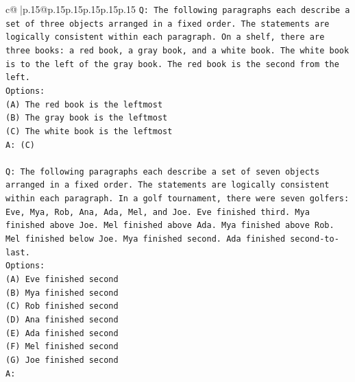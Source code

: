 \documentclass{article}
\begin{document}
{\begin{supertabular}{c@{$\;$}|p{.15\linewidth}@{}p{.15\linewidth}p{.15\linewidth}p{.15\linewidth}p{.15\linewidth}p{.15\linewidth}}
{{{\texttt{Q: The following paragraphs each describe a set of three objects arranged in a fixed order. The statements are logically consistent within each paragraph. On a shelf, there are three books: a red book, a gray book, and a white book. The white book is to the left of the gray book. The red book is the second from the left.} \\
\texttt{Options:} \\
\texttt{(A) The red book is the leftmost} \\
\texttt{(B) The gray book is the leftmost} \\
\texttt{(C) The white book is the leftmost} \\
\texttt{A: (C)} \\
\\ 
\texttt{Q: The following paragraphs each describe a set of seven objects arranged in a fixed order. The statements are logically consistent within each paragraph. In a golf tournament, there were seven golfers: Eve, Mya, Rob, Ana, Ada, Mel, and Joe. Eve finished third. Mya finished above Joe. Mel finished above Ada. Mya finished above Rob. Mel finished below Joe. Mya finished second. Ada finished second{-}to{-}last.} \\
\texttt{Options:} \\
\texttt{(A) Eve finished second} \\
\texttt{(B) Mya finished second} \\
\texttt{(C) Rob finished second} \\
\texttt{(D) Ana finished second} \\
\texttt{(E) Ada finished second} \\
\texttt{(F) Mel finished second} \\
\texttt{(G) Joe finished second} \\
\texttt{A:} \\
            }
        }
    }
     \\ \\


\end{supertabular}}
\end{document}

